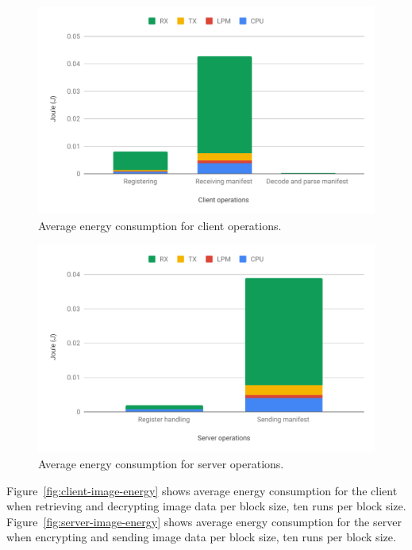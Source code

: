 \documentclass[0-thesis.tex]{subfiles}
\begin{document}
\begin{figure}
    \caption{Average energy consumption for client operations.}
    \label{fig:client-operations-energy}
    \includegraphics[scale=0.8]{images/client-operations-energy.pdf}
\end{figure}

\begin{figure}
    \caption{Average energy consumption for server operations.}
    \label{fig:server-operations-energy}
    \includegraphics[scale=0.8]{images/server-operations-energy.pdf}
\end{figure}

Figure~\ref{fig:client-image-energy} shows average energy consumption for the client when
retrieving and decrypting image data per block size, ten runs per block size.
Figure~\ref{fig:server-image-energy} shows average energy consumption for the server when
encrypting and sending image data per block size, ten runs per block size.
\end{document}

